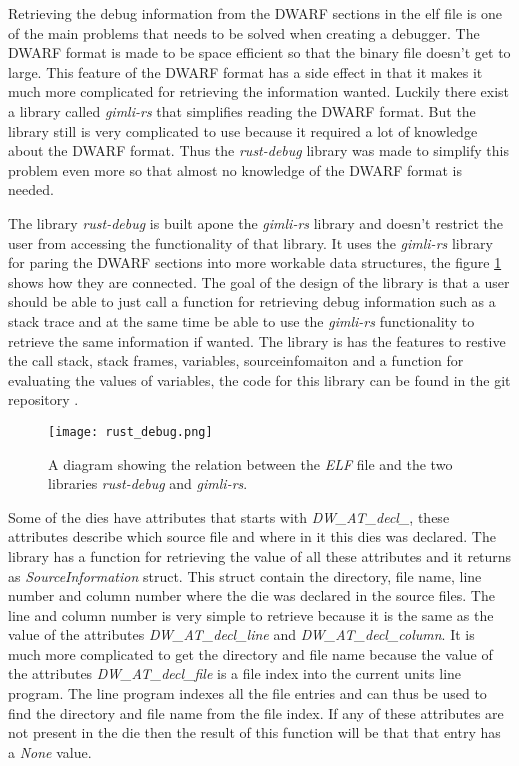 
Retrieving the debug information from the \gls{DWARF} sections in the \gls{elf} file is one of the main problems that needs to be solved when creating a debugger.
The \gls{DWARF} format is made to be space efficient so that the binary file doesn't get to large.
This feature of the \gls{DWARF} format has a side effect in that it makes it much more complicated for retrieving the information wanted.
Luckily there exist a library called \emph{gimli-rs} that simplifies reading the \gls{DWARF} format.
But the library still is very complicated to use because it required a lot of knowledge about the \gls{DWARF} format.
Thus the \emph{rust-debug} library was made to simplify this problem even more so that almost no knowledge of the \gls{DWARF} format is needed.


The library \emph{rust-debug} is built apone the \emph{gimli-rs} library and doesn't restrict the user from accessing the functionality of that library.
It uses the \emph{gimli-rs} library for paring the \gls{DWARF} sections into more workable data structures, the figure \ref{fig:rustdebug} shows how they are connected.
The goal of the design of the library is that a user should be able to just call a function for retrieving debug information such as a stack trace and at the same time be able to use the \emph{gimli-rs} functionality to retrieve the same information if wanted.
The library is has the features to restive the call stack, stack frames, variables, sourceinfomaiton and a function for evaluating the values of variables, the code for this library can be found in the git repository \cite{rust-debug}.


\begin{figure}[h]
	\centering
	\texttt{[image: rust\_debug.png]}
	\caption{A diagram showing the relation between the \emph{ELF} file and the two libraries \emph{rust-debug} and \emph{gimli-rs}.}
	\label{fig:rustdebug}
\end{figure}


Some of the dies have attributes that starts with \emph{DW\_AT\_decl\_}, these attributes describe which source file and where in it this dies was declared.
The library has a function for retrieving the value of all these attributes and it returns as \emph{SourceInformation} struct.
This struct contain the directory, file name, line number and column number where the die was declared in the source files.
The line and column number is very simple to retrieve because it is the same as the value of the attributes \emph{DW\_AT\_decl\_line} and \emph{DW\_AT\_decl\_column}.
It is much more complicated to get the directory and file name because the value of the attributes \emph{DW\_AT\_decl\_file} is a file index into the current units line program.
The line program indexes all the file entries and can thus be used to find the directory and file name from the file index.
If any of these attributes are not present in the die then the result of this function will be that that entry has a \emph{None} value.





